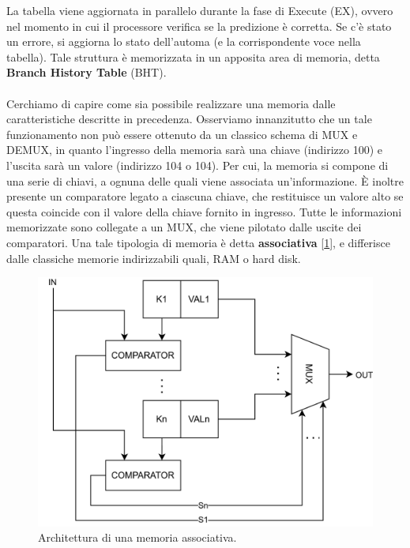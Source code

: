 La tabella viene aggiornata in parallelo durante la fase di Execute (EX), ovvero nel momento in cui il processore verifica se la predizione è corretta. Se c'è stato un errore, si aggiorna lo stato dell'automa (e la corrispondente voce nella tabella). Tale struttura è memorizzata in un apposita area di memoria, detta \textbf{Branch History Table} (BHT).
\\
\\
Cerchiamo di capire come sia possibile realizzare una memoria dalle caratteristiche descritte in precedenza. Osserviamo innanzitutto che un tale funzionamento non può essere ottenuto da un classico schema di MUX e DEMUX, in quanto l'ingresso della memoria sarà una chiave (indirizzo 100) e l'uscita sarà un valore (indirizzo 104 o 104). Per cui, la memoria si compone di una serie di chiavi, a ognuna delle quali viene associata un'informazione. \MakeUppercase{è} inoltre presente un comparatore legato a ciascuna chiave, che restituisce un valore alto se questa coincide con il valore della chiave fornito in ingresso. Tutte le informazioni memorizzate sono collegate a un MUX, che viene pilotato dalle uscite dei comparatori. Una tale tipologia di memoria è detta \textbf{associativa} [\ref{fig:mem_associativa}], e differisce dalle classiche memorie indirizzabili quali, RAM o hard disk.
\begin{figure}[ht]
    \centering
    \includegraphics[width=0.5\linewidth]{img/mem_associativa.png}
    \caption{Architettura di una memoria associativa.}
    \label{fig:mem_associativa}
\end{figure}

